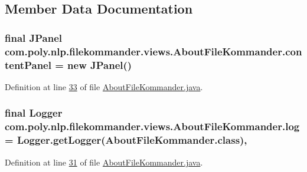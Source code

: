 \subsection{Member Data Documentation}
\hypertarget{classcom_1_1poly_1_1nlp_1_1filekommander_1_1views_1_1_about_file_kommander_ad925c308e870c6d3789d72cdec139c93}{
\subsubsection[{content\-Panel}]{\setlength{\rightskip}{0pt plus 5cm}final J\-Panel com.\-poly.\-nlp.\-filekommander.\-views.\-About\-File\-Kommander.\-content\-Panel = new J\-Panel()\hspace{0.3cm}{\ttfamily [private]}}}\label{classcom_1_1poly_1_1nlp_1_1filekommander_1_1views_1_1_about_file_kommander_ad925c308e870c6d3789d72cdec139c93}


Definition at line \hyperlink{L33}{33} of file \hyperlink{}{About\-File\-Kommander.\-java}.

\hypertarget{classcom_1_1poly_1_1nlp_1_1filekommander_1_1views_1_1_about_file_kommander_af5cbf6e6423901be93a2a580049f3728}{
\subsubsection[{log}]{\setlength{\rightskip}{0pt plus 5cm}final Logger com.\-poly.\-nlp.\-filekommander.\-views.\-About\-File\-Kommander.\-log = Logger.\-get\-Logger(About\-File\-Kommander.\-class)\hspace{0.3cm}{\ttfamily [static]}, {\ttfamily [private]}}}\label{classcom_1_1poly_1_1nlp_1_1filekommander_1_1views_1_1_about_file_kommander_af5cbf6e6423901be93a2a580049f3728}


Definition at line \hyperlink{L31}{31} of file \hyperlink{}{About\-File\-Kommander.\-java}.

